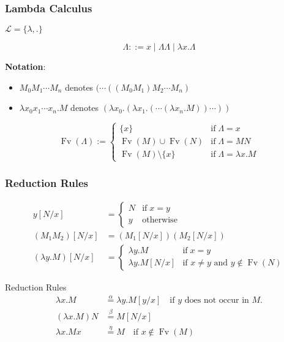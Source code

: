 \documentclass[UTF8,aspectratio=43,11pt,colorlinks,compress,openany]{beamer}%
\begin{document}
\begin{frame}\frametitle{Lambda Calculus}
	$\mathscr{L}=\{\lambda,.\}$
\setlength\abovedisplayskip{0pt}
\setlength\belowdisplayskip{0pt}
	\begin{definition}
		\[
		\Lambda::=x\mid \Lambda\Lambda\mid \lambda x.\Lambda
		\]
	\end{definition}
	\textbf{Notation}:
	\begin{itemize}
		\item $M_0M_1\cdots M_n$ denotes $(\cdots((M_0M_1)M_2\cdots M_n)$
		\item $\lambda x_0x_1\cdots x_n.M$ denotes $(\lambda x_0.(\lambda x_1.(\cdots(\lambda x_n.M))\cdots))$
	\end{itemize}
\setlength\abovedisplayskip{0pt}
\setlength\belowdisplayskip{0pt}
	\begin{definition}
		\[
		\operatorname{Fv}(\Lambda):=
		\begin{cases}
		\{x\} &\text{if}\;\Lambda=x\\
		\operatorname{Fv}(M)\cup \operatorname{Fv}(N) &\text{if}\;\Lambda=MN\\
		\operatorname{Fv}(M)\setminus\{x\} &\text{if}\;\Lambda=\lambda x.M
		\end{cases}
		\]
	\end{definition}
\end{frame}

\begin{frame}\frametitle{Reduction Rules}
\setlength\abovedisplayskip{0pt}
\setlength\belowdisplayskip{0pt}
	\begin{definition}[Substitution]
		\begin{align*}
		y[N/x]&=
		\begin{cases}
		N &\text{if}\; x=y\\
		y &\text{otherwise}
		\end{cases}\\
		(M_1M_2)[N/x]&=\left(M_1[N/x]\right)\left(M_2[N/x]\right)\\
		(\lambda y.M)[N/x]&=
		\begin{cases}
		\lambda y.M &\text{if}\; x=y\\
		\lambda y.M[N/x] &\mbox{if $x\neq y$ and $y\notin \operatorname{Fv}(N)$}
		\end{cases}
		\end{align*}
	\end{definition}
\setlength\abovedisplayskip{0pt}
\setlength\belowdisplayskip{0pt}
	\begin{block}{Reduction Rules}
		\begin{align*}
		\lambda x.M&\stackrel{\alpha}{=}\lambda y.M[y/x] \quad\text{if $y$ does not occur in $M$.}\\
		(\lambda x.M)N&\stackrel{\beta}{=}M[N/x]\\
		\lambda x.Mx&\stackrel{\eta}{=}M \quad\text{if $x\notin \operatorname{Fv}(M)$}
		\end{align*}
	\end{block}
\end{frame}
\end{document}
